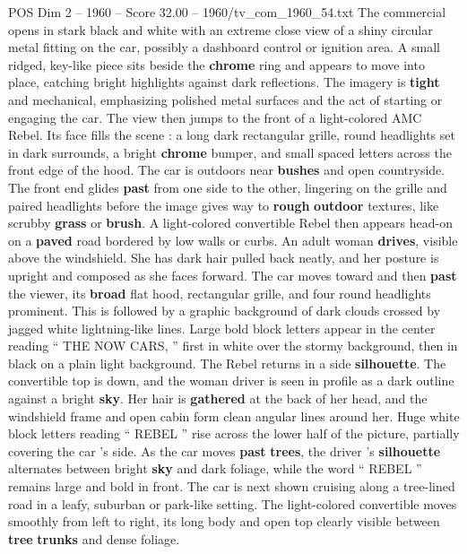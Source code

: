 \begin{textsample}{POS Dim 2 – 1960 – Score 32.00 – 1960/tv\_com\_1960\_54.txt}  \label{ex:f2_pos_002}
The commercial opens in stark black and white with an extreme close view of a shiny circular metal fitting on the car, possibly a dashboard control or ignition area.
A small ridged, key-like piece sits beside the \textbf{chrome} ring and appears to move into place, catching bright highlights against dark reflections.
The imagery is \textbf{tight} and mechanical, emphasizing polished metal surfaces and the act of starting or engaging the car.
The view then jumps to the front of a light-colored AMC Rebel.
Its face fills the scene : a long dark rectangular grille, round headlights set in dark surrounds, a bright \textbf{chrome} bumper, and small spaced letters across the front edge of the hood.
The car is outdoors near \textbf{bushes} and open countryside.
The front end glides \textbf{past} from one side to the other, lingering on the grille and paired headlights before the image gives way to \textbf{rough} \textbf{outdoor} textures, like scrubby \textbf{grass} or \textbf{brush}.
A light-colored convertible Rebel then appears head-on on a \textbf{paved} road bordered by low walls or curbs.
An adult woman \textbf{drives}, visible above the windshield.
She has dark hair pulled back neatly, and her posture is upright and composed as she faces forward.
The car moves toward and then \textbf{past} the viewer, its \textbf{broad} flat hood, rectangular grille, and four round headlights prominent.
This is followed by a graphic background of dark clouds crossed by jagged white lightning-like lines.
Large bold block letters appear in the center reading “ THE NOW CARS, ” first in white over the stormy background, then in black on a plain light background.
The Rebel returns in a side \textbf{silhouette}.
The convertible top is down, and the woman driver is seen in profile as a dark outline against a bright \textbf{sky}.
Her hair is \textbf{gathered} at the back of her head, and the windshield frame and open cabin form clean angular lines around her.
Huge white block letters reading “ REBEL ” rise across the lower half of the picture, partially covering the car ’s side.
As the car moves \textbf{past} \textbf{trees}, the driver ’s \textbf{silhouette} alternates between bright \textbf{sky} and dark foliage, while the word “ REBEL ” remains large and bold in front.
The car is next shown cruising along a tree-lined road in a leafy, suburban or park-like setting.
The light-colored convertible moves smoothly from left to right, its long body and open top clearly visible between \textbf{tree} \textbf{trunks} and dense foliage.

\end{textsample}
